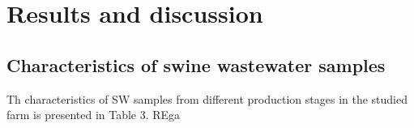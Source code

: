 \section{Results and discussion}
\subsection{Characteristics of swine wastewater samples}
Th characteristics of SW samples from different production stages in the studied farm is presented in Table 3. REga